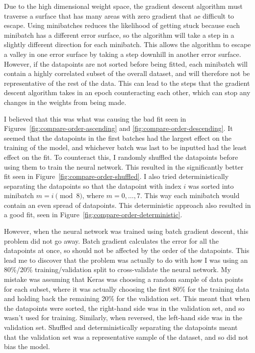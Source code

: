 Due to the high dimensional weight space, the gradient descent algorithm must traverse a surface that has many areas with zero gradient that ae difficult to escape.
Using minibatches reduces the likelihood of getting stuck because each minibatch has a different error surface, so the algorithm will take a step in a slightly different direction for each minibatch.
This allows the algorithm to escape a valley in one error surface by taking a step downhill in another error surface.
However, if the datapoints are not sorted before being fitted, each minibatch will contain a highly correlated subset of the overall dataset, and will therefore not be representative of the rest of the data.
This can lead to the steps that the gradient descent algorithm takes in an epoch counteracting each other, which can stop any changes in the weights from being made.

I believed that this was what was causing the bad fit seen in Figures~\ref{fig:compare-order-ascending} and \ref{fig:compare-order-descending}.
It seemed that the datapoints in the first batches had the largest effect on the training of the model, and whichever batch was last to be inputted had the least effect on the fit.
To counteract this, I randomly shuffled the datapoints before using them to train the neural network.
This resulted in the significantly better fit seen in Figure~\ref{fig:compare-order-shuffled}.
I also tried deterministically separating the datapoints so that the datapoint with index \(i\) was sorted into minibatch \(m = i \pmod 8\), where \(m = 0, \dots, 7\).
This way each minibatch would contain an even spread of datapoints.
This deterministic approach also resulted in a good fit, seen in Figure~\ref{fig:compare-order-deterministic}.

However, when the neural network was trained using batch gradient descent, this problem did not go away.
Batch gradient calculates the error for all the datapoints at once, so should not be affected by the order of the datapoints.
This lead me to discover that the problem was actually to do with how I was using an 80\%/20\% training/validation split to cross-validate the neural network.
My mistake was assuming that Keras was choosing a random sample of data points for each subset, where it was actually choosing the first 80\% for the training data and holding back the remaining 20\% for the validation set.
This meant that when the datapoints were sorted, the right-hand side was in the validation set, and so wasn't used for training.
Similarly, when reversed, the left-hand side was in the validation set.
Shuffled and deterministically separating the datapoints meant that the validation set was a representative sample of the dataset, and so did not bias the model.

